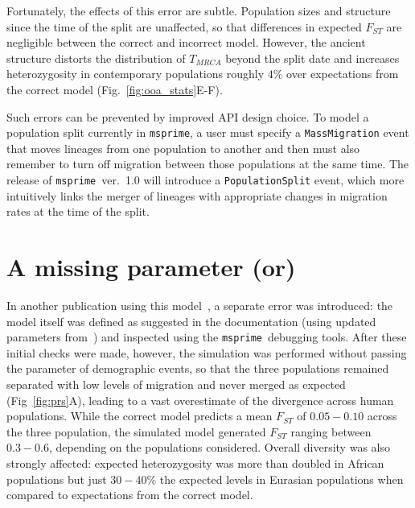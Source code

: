 \documentclass{article}
\newcommand{\msprime}[0]{\texttt{msprime}}
\newcommand{\aprcomment}[1]{{\textcolor{blue}{APR: #1}}}
\begin{document}
Fortunately, the effects of this error are subtle. Population sizes and structure since the time of
the split are unaffected, so that differences in expected $F_{ST}$ are negligible between
the correct and incorrect model. However, the ancient structure distorts the distribution
of $T_{MRCA}$ beyond the split date and increases
heterozygosity in contemporary populations roughly $4\%$ over expectations
from the correct model (Fig.~\ref{fig:ooa_stats}E-F).


Such errors can be prevented by improved API design choice.
To model a population split currently in \msprime, a user must specify a
\texttt{MassMigration} event that moves lineages from one population to another
and then must also remember to turn off migration
between those populations at the same time.
The release of \msprime~ver.~1.0 will introduce a \texttt{PopulationSplit} event,
which more intuitively links the merger of lineages with appropriate changes in
migration rates at the time of the split.

\section{A missing parameter (or) }

In another publication using this model~\citep{martin2017human},
a separate error was introduced: the model itself was defined as suggested
in the documentation (using updated parameters
from~\citet{gravel2011demographic}) and inspected
using the \msprime\ debugging tools.
After these initial checks were made, however, the simulation
was performed without passing the parameter of demographic events,
so that the three populations remained separated with low levels of migration and
never merged as expected (Fig~\ref{fig:prs}A),
leading to a vast overestimate of the divergence across human populations.
While the correct model predicts a mean $F_{ST}$ of
$0.05 - 0.10$ across the three population, the simulated model generated $F_{ST}$
ranging between $0.3 - 0.6$, depending on the populations considered.
Overall diversity was also strongly affected: expected heterozygosity was more than
doubled in African populations but just $30-40\%$ the expected
levels in Eurasian populations when compared to expectations from the correct model.
\end{document}
